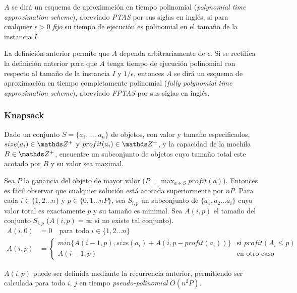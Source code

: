\documentclass[../np-approximations.tex]{subfiles}
\begin{document}
$A$ se dirá un esquema de aproximación en tiempo polinomial
(\emph{polynomial time approximation scheme}), abreviado \emph{PTAS}
por sus siglas en inglés, si para cualquier $\epsilon > 0$
\emph{fijo} su tiempo de ejecución es polinomial en el tamaño de la 
instancia $I$.

La definición anterior permite que $A$ dependa arbitrariamente de 
$\epsilon$. Si se rectifica la definición anterior para que $A$ 
tenga tiempo de ejecución polinomial con respecto al tamaño de la 
instancia $I$ y $1/\epsilon$, entonces $A$ se dirá un esquema de 
aproximación en tiempo completamente polinomial 
(\emph{fully polynomial time approximation scheme}), abreviado
\emph{FPTAS} por sus siglas en inglés.

\subsubsection{Knapsack}

\begin{statement}
	Dado un conjunto $S = \{a_1, \dots , a_n\}$ de objetos, con 
	valor y tamaño especificados, $size(a_i) \in \Z^+$ y
	$profit(a_i) \in \Z^+$, y la capacidad de la mochila
	$B \in \Z^+$, encuentre un subconjunto de objetos cuyo tamaño 
	total este acotado por $B$ y su valor sea maximal.
\end{statement}

Sea $P$ la ganancia del objeto de mayor valor
($P=\max_{a \in S} profit(a)$). Entonces es fácil observar que 
cualquier solución está acotada superiormente por $nP$. Para cada
$i \in \{1, 2 \dots n\}$ y $p \in \{0, 1 \dots nP\}$, sea $S_{i,p}$
un subconjunto de $\{a_1, a_2 \dots a_i\}$ cuyo valor total es 
exactamente $p$ y su tamaño es minimal. Sea $A(i,p)$ el tamaño del 
conjunto $S_{i,p}$ ($A(i,p)=\infty$ si no existe tal conjunto).
\begin{align*}
	A(i,0)   & =0 \quad \text{para todo $i \in \{1, 2 \dots n\}$} \\
	A(i, p)  & =                                                  
	\begin{cases}
	min\{A(i-1, p), size(a_{i}) + A(i,p-profit(a_{i}))\}
	         & \text{si $profit(A_{i} \le p)$}                    \\
	A(i-1,p) & \text{en otro caso}                                
	\end{cases}
\end{align*}

$A(i,p)$ puede ser definida mediante la recurrencia anterior, 
permitiendo ser calculada para todo $i$, $j$ en tiempo
\emph{pseudo-polinomial} $O(n^2P)$.
\end{document}
